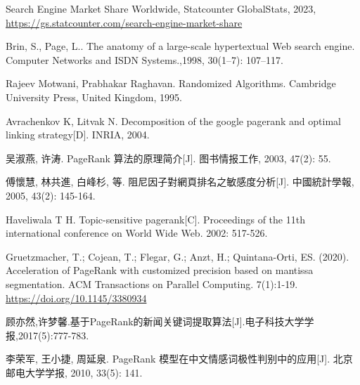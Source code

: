 \documentclass[UTF8,openany]{ctexbook}
\begin{document}
\newpage
\setlength{\bibsep}{1ex}  %
\begin{thebibliography}{99}
    \thispagestyle{fancy}


    Search Engine Market Share Worldwide, Statcounter GlobalStats, 2023, \url{https://gs.statcounter.com/search-engine-market-share}

    Brin, S., Page, L.. The anatomy of a large-scale hypertextual Web search engine. Computer Networks and ISDN Systems.,1998, 30(1–7): 107–117.

    Rajeev Motwani, Prabhakar Raghavan. Randomized Algorithms. Cambridge University Press, United Kingdom, 1995.

    Avrachenkov K, Litvak N. Decomposition of the google pagerank and optimal linking strategy[D]. INRIA, 2004.

    吴淑燕, 许涛. PageRank 算法的原理简介[J]. 图书情报工作, 2003, 47(2): 55.

    傅懷慧, 林共進, 白峰杉, 等. 阻尼因子對網頁排名之敏感度分析[J]. 中國統計學報, 2005, 43(2): 145-164.

    Haveliwala T H. Topic-sensitive pagerank[C]. Proceedings of the 11th international conference on World Wide Web. 2002: 517-526.

    Gruetzmacher, T.; Cojean, T.; Flegar, G.; Anzt, H.; Quintana-Orti, ES. (2020). Acceleration
    of PageRank with customized precision based on mantissa segmentation. ACM
    Transactions on Parallel Computing. 7(1):1-19. \url{https://doi.org/10.1145/3380934}

    顾亦然,许梦馨.基于PageRank的新闻关键词提取算法[J].电子科技大学学报,2017(5):777-783.

    李荣军, 王小捷, 周延泉. PageRank 模型在中文情感词极性判别中的应用[J]. 北京邮电大学学报, 2010, 33(5): 141.

\end{thebibliography}
\end{document}
